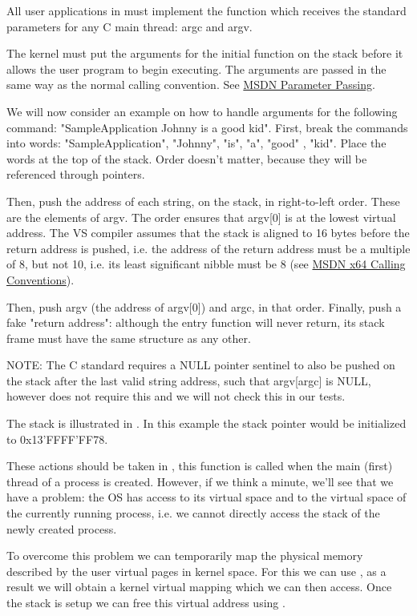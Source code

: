 \begin{appendices}
All user applications in \projectname must implement the  function which receives the
standard parameters for any C main thread: argc and argv.

The kernel must put the arguments for the initial function on the stack before it allows the user
program to begin executing. The arguments are passed in the same way as the normal calling
convention. See \href{https://msdn.microsoft.com/en-us/library/zthk2dkh.aspx}{MSDN Parameter Passing}.

We will now consider an example on how to handle arguments for the following command:
"SampleApplication Johnny is a good kid". First, break the commands into words: "SampleApplication",
"Johnny", "is", "a", "good" , "kid". Place the words at the top of the stack. Order doesn't matter,
because they will be referenced through pointers.

Then, push the address of each string, on the stack, in right-to-left order. These are the elements
of argv. The order ensures that argv[0] is at the lowest virtual address. The VS compiler assumes
that the stack is aligned to 16 bytes before the return address is pushed, i.e. the address of the
return address must be a multiple of 8, but not 10, i.e. its least significant nibble must be 8
(see \href{https://msdn.microsoft.com/en-us/library/ms235286.aspx}{MSDN x64 Calling Conventions}).

Then, push argv (the address of argv[0]) and argc, in that order. Finally, push a fake "return
address": although the entry function will never return, its stack frame must have the same
structure as any other.

NOTE: The C standard requires a NULL pointer sentinel to also be pushed on the stack after the last
valid string address, such that argv[argc] is NULL, however \projectname does not require this and
we will not check this in our tests.

The stack is illustrated in . In this example the stack pointer would be
initialized to 0x13'FFFF'FF78.

These actions should be taken in , this function is called
when the main (first) thread of a process is created. However, if we think a minute, we'll see that
we have a problem: the OS has access to its virtual space and to the virtual space of the currently
running process, i.e. we cannot directly access the stack of the newly created process.

To overcome this problem we can temporarily map the physical memory described by the user virtual
pages in kernel space. For this we can use , as a
result we will obtain a kernel virtual mapping which we can then access. Once the stack is setup
we can free this virtual address using .


\end{appendices}
